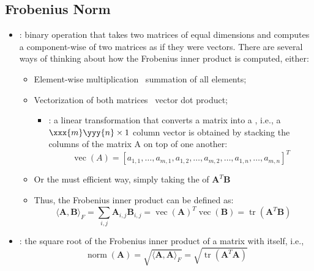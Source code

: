\begin{itemize}
  \subsection{Frobenius Norm}\label{Frobenius Norm}
  \begin{itemize}
    \item {} : binary operation that takes two matrices of equal dimensions and computes a component-wise \hyperref[The Dot Product]{} of two matrices as if they were vectors. There are several ways of thinking about how the Frobenius inner product is computed, either:
      \begin{itemize}
        \item Element-wise multiplication \to~summation of all elements;
        \item Vectorization of both matrices \to~vector dot product;
          \begin{itemize}
            \item {}: a linear transformation that converts a matrix into a , i.e., a \(\xxx{m}\yyy{n} \times 1\) column vector is obtained by stacking the columns of the matrix A on top of one another: 
            \[%
            \operatorname{vec}(A)=[a_{1,1},\ldots ,a_{m,1},a_{1,2},\ldots ,a_{m,2},\ldots ,a_{1,n},\ldots ,a_{m,n}]^T
            \]%
          \end{itemize}
        \item Or the must efficient way, simply taking the \hyperref[Diagonal and Trace]{} of \(\bm{A}^T \bm{B}\)
        \item Thus, the Frobenius inner product can be defined as:
        \[%
        \langle\bm{A}, \bm{B} \rangle_F =
        \sum_{i,j}\bm{A}_{i,j}\bm{B}_{i,j} = 
        \operatorname{vec}(\bm{A})^T\operatorname{vec}(\bm{B})=
        \operatorname{tr}(\bm{A}^T\bm{B})
        \]%
      \end{itemize}
    \item {}: the square root of the Frobenius inner product of a matrix with itself, i.e.,
    \[%
    \operatorname{norm}(\bm{A}) = \sqrt{\langle\bm{A}, \bm{A} \rangle_F} = \sqrt{\operatorname{tr}(\bm{A}^T \bm{A})}
\]
\end{itemize}
\end{itemize}
